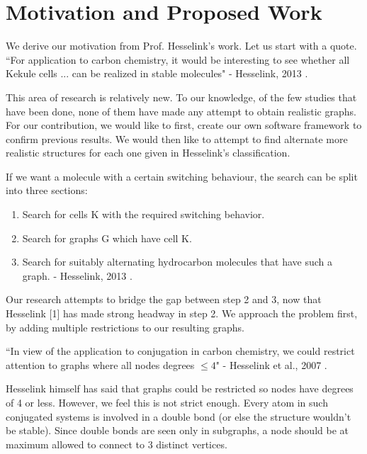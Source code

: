 \documentclass[12pt]{article}
\begin{document}
\section{Motivation and Proposed Work}

We derive our motivation from Prof. Hesselink's work. Let us start with a quote. 	
``For application to carbon chemistry, it would be interesting to see whether all Kekule cells ... can be realized in stable molecules" 	- Hesselink, 2013 \cite{H13}.

	This area of research is relatively new. To our knowledge, of the few studies that have been done, none of them have made any attempt to obtain realistic graphs. For our contribution, we would like to first, create our own software framework to confirm previous results. We would then like to attempt to find alternate more realistic structures for each one given in Hesselink’s classification. 

	If we want a molecule with a certain switching behaviour, the search can be split into three sections:
	
\begin{enumerate}
\item Search for cells K with the required switching behavior.
\item Search for graphs G which have cell K.
\item Search for suitably alternating hydrocarbon molecules that have such a graph. 	- Hesselink, 2013 \cite{H13}.
\end{enumerate}

	Our research attempts to bridge the gap between step 2 and 3, now that Hesselink [1] has made strong headway in step 2.  We approach the problem first, by adding multiple restrictions to our resulting graphs.

``In view of the application to conjugation in carbon chemistry, we could restrict attention to graphs where all nodes degrees  $ \leq  4$" 	- Hesselink et al., 2007 \cite{HH13}. 

Hesselink himself has said that graphs could be restricted so nodes have degrees of 4 or less. However, we feel this is not strict enough. Every atom in such conjugated systems is involved in a double bond (or else the structure wouldn’t be stable). Since double bonds are seen only in subgraphs, a node should be at maximum allowed to connect to 3 distinct vertices. 
\end{document}
